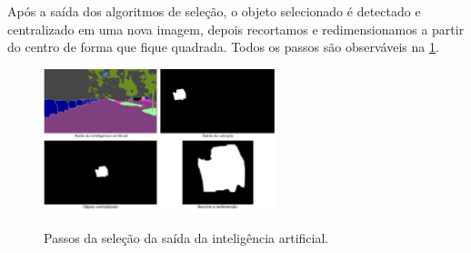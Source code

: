 
Após a saída dos algoritmos de seleção, o objeto selecionado é detectado e centralizado em uma nova imagem, depois recortamos e redimensionamos a partir do centro de forma que fique quadrada. Todos os passos são observáveis na \cref{fig:saidas_selecao}.

\begin{figure}[!ht]
	\centering
    \caption{Passos da seleção da saída da inteligência  artificial.}
	\includegraphics[width=0.6\textwidth]{figures/saidas_selecao.png}
	\label{fig:saidas_selecao}
\end{figure}
